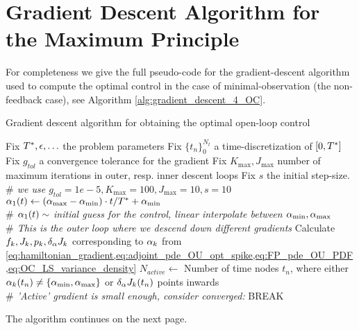 \section{Gradient Descent Algorithm for the Maximum Principle}
For completeness we give the full pseudo-code for the gradient-descent algorithm
used to compute the optimal control in the case of minimal-observation (the
non-feedback case), see Algorithm \ref{alg:gradient_descent_4_OC}. 
\begin{algorithm}
\begin{algorithmic}
\caption{ Gradient descent algorithm for obtaining the optimal open-loop 
control}
\label{alg:gradient_descent_4_OC}
\State Fix ${ T^* }, {\epsilon}, \ldots$ the problem parameters
\State Fix $\{t_n\}_0^{N_t}$ a time-discretization of $[0,{ T^* }]$
\State Fix $g_{tol}$ a convergence tolerance for the gradient
\State Fix $K_{\max}, J_{\max}$ number of maximum iterations in outer, resp.
inner descent loops
\State Fix $s$ the initial step-size. 
\\ {\itshape $\#$ we use $g_{tol}=1e-5,K_{\max}=100,J_{\max}=10,s=10$}
\State $\alpha_1(t) \gets ({ \alpha_{\textrm{max}} }-{ \alpha_{\textrm{min}} }) \cdot t / { T^* } + { \alpha_{\textrm{min}} }$ 
\\{\itshape  $\#$ $\alpha_1(t) \sim$ initial guess for the control, linear
interpolate between ${ \alpha_{\textrm{min}} }, { \alpha_{\textrm{max}} }$}
\\ {\itshape $\#$ This is the outer loop where we descend down different
gradients}
 \State Calculate $f_k,J_{k},p_k, \delta_\alpha J_k$ corresponding to
	$\alpha_k$ from
	\cref{eq:hamiltonian_gradient,eq:adjoint_pde_OU_opt_spike,eq:FP_pde_OU_PDF,eq:OC_LS_variance_density}
	\State $N_{active}\gets$   Number of time nodes $t_n$, where either
	$\alpha_k(t_n) \neq \{{ \alpha_{\textrm{min}} }, { \alpha_{\textrm{max}} }\}$ or $\delta_\alpha J_k(t_n)$ points inwards
		  \\ {\itshape  $\#$ 'Active' gradient is small enough,
		 consider converged:}
		 \State BREAK
	\EndIf
    \end{algorithmic}
    \end{algorithm}
The algorithm continues on the next page.  
